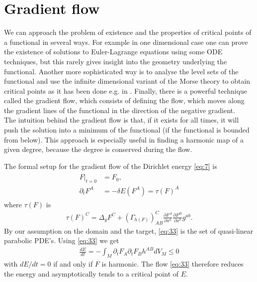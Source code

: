 \section{Gradient flow}
\label{sec:gradient-flow}

We can approach the problem of existence and the properties of
critical points of a functional in several ways. For example in one
dimensional case one can prove the existence of solutions to
Euler-Lagrange equations using some ODE techniques, but this rarely
gives insight into the geometry underlying the functional. Another
more sophisticated way is to analyse the level sets of the functional
and use the infinite dimensional variant of the Morse theory to obtain
critical points as it has been done e.g. in
\cite{Corlette2001}. Finally, there is a powerful technique called the
gradient flow, which consists of defining the flow, which moves along
the gradient lines of the functional in the direction of
the negative gradient. \\

The intuition behind the gradient flow is that, if it exists for all
times, it will push the solution into a minimum of the functional (if
the functional is bounded from below). This approach is especially
useful in finding a harmonic map of a given degree, because the degree
is conserved during the flow.

The formal setup for the gradient flow of the Dirichlet energy
\eqref{eq:7} is
\begin{align}
  \label{eq:33}
    \begin{split}
    F\big|_{t=0}&=F_0,\\
    \partial_t F^A&=-\delta E(F^A)=\tau(F)^A
  \end{split}
\end{align}
where $\tau(F)$ is
\begin{align}
  \label{eq:34}
  \tau(F)^C=\Delta_g F^C+(\Gamma_{h(F)})_{AB}^{C}\frac{\partial
    F^A}{\partial x^a}\frac{\partial F^B}{\partial x^b}g^{ab}.
\end{align}
By our assumption on the domain and the target, \eqref{eq:33} is the
set of quasi-linear parabolic PDE's. Using \eqref{eq:33} we get
\begin{align}
  \label{eq:35}
  \frac{dE}{dt}=-\int_M \partial_t F_A\partial_t F_B h^{AB}
  dV_M\le0
\end{align}
with $dE/dt=0$ if and only if $F$ is harmonic. The flow \eqref{eq:33}
therefore reduces the energy and asymptotically tends to a
critical point of $E$.\\

